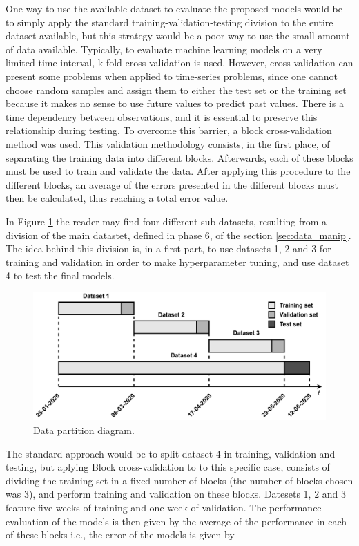 One way to use the available dataset to evaluate the proposed models would be to simply apply the standard training-validation-testing division to the entire dataset available, but this strategy would be a poor way to use the small amount of data available. Typically, to evaluate machine learning models on a very limited time interval, k-fold cross-validation is used. However, cross-validation can present some problems when applied to time-series problems, since one cannot choose random samples and assign them to either the test set or the training set because it makes no sense to use future values to predict past values. There is a time dependency between observations, and it is essential to preserve this relationship during testing. To overcome this barrier, a block cross-validation method was used. This validation methodology consists, in the first place, of separating the training data into different blocks. Afterwards, each of these blocks must be used to train and validate the data. After applying this procedure to the different blocks, an average of the errors presented in the different blocks must then be calculated, thus reaching a total error value. 

In Figure \ref{partition} the reader may find four different sub-datasets, resulting from a division of the main datastet, defined in phase 6, of the section \ref{sec:data_manip}. The idea behind this division is, in a first part, to use datasets 1, 2 and 3 for training and validation in order to make hyperparameter tuning, and use dataset 4 to test the final models.

\begin{figure}[h!]
    \centering
    \begin{center}
    \includegraphics[width=1\textwidth]{Images/data_partition.png}
    \caption{Data partition diagram.}
    \label{partition}
    \end{center}
\end{figure}
The standard approach would be to split dataset 4 in training, validation and testing, but aplying Block cross-validation to to this specific case, consists of dividing the training set in a fixed number of blocks (the number of blocks chosen was 3), and perform training and validation on these blocks.
Datesets 1, 2 and 3 feature five weeks of training and one week of validation. The performance evaluation of the models is then given by the average of the performance in each of these blocks i.e., the error of the models is given by

